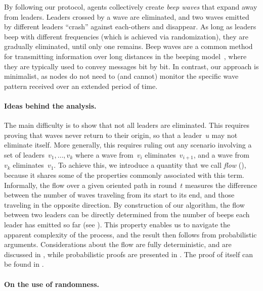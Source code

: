 \documentclass{article}
\begin{document}
By following our protocol, agents collectively create {\em beep waves} that expand away from leaders. Leaders crossed by a wave are eliminated, and two waves emitted by different leaders ``crash'' against each-others and disappear. As long as leaders beep with different frequencies (which is achieved via randomization), they are gradually eliminated, until only one remains.
Beep waves are a common method for transmitting information over long distances in the beeping model~\cite{GhaffariH13,CzumajD19},
where they are typically used to convey messages bit by bit. In contrast, our approach is minimalist, as nodes do not need to (and cannot) monitor the specific wave pattern received over an extended period of time.

\paragraph{Ideas behind the analysis.}

The main difficulty is to show that not all leaders are eliminated. This requires proving that waves never return to their origin, so that a leader~$u$ may not eliminate itself. More generally, this requires ruling out any scenario involving a set of leaders~$v_1,\ldots,v_k$ where a wave from~$v_i$ eliminates~$v_{i+1}$, and a wave from~$v_k$ eliminates~$v_1$.
To achieve this, we introduce a quantity that we call {\em flow} (), because it shares some of the properties commonly associated with this term.
Informally, the flow over a given oriented path in round~$t$ measures the difference between the number of waves traveling from its start to its end, and those traveling in the opposite direction. By construction of our algorithm, the flow between two leaders can be directly determined from the number of beeps each leader has emitted so far (see ). This property enables us to navigate the apparent complexity of the process, and the result then follows from probabilistic arguments.
Considerations about the flow are fully deterministic, and are discussed in , while probabilistic proofs are presented in . The proof of  itself can be found in .


\paragraph{On the use of randomness.} 
\end{document}
